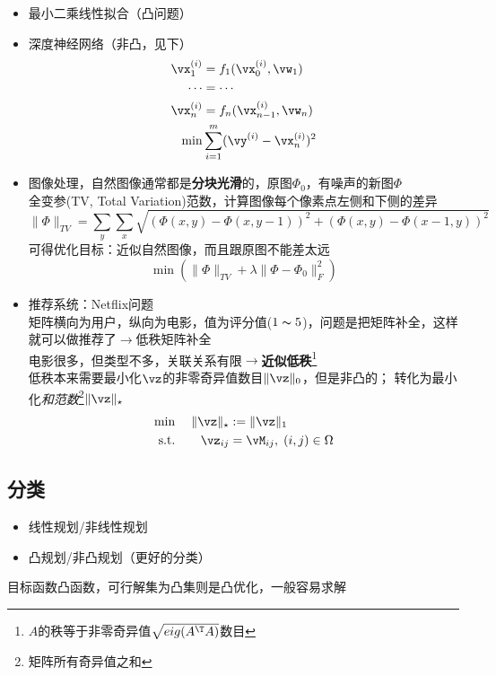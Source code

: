 \documentclass{note}
\begin{document}
\begin{example}
\begin{itemize}
\item 最小二乘线性拟合（凸问题）
\item 深度神经网络（非凸，见下）
\[\begin{aligned}
\vx_1^{(i)}&=f_1(\vx_0^{(i)},\vw_1)\\
\cdots&=\cdots\\
\vx_n^{(i)}&=f_n(\vx_{n-1}^{(i)},\vw_n)\\
\min&\sum_{i=1}^m(\vy^{(i)}-\vx_n^{(i)})^2
\end{aligned}\]
\item 图像处理，自然图像通常都是\textbf{分块光滑}的，原图$\Phi_0$，有噪声的新图$\Phi$\\
全变参(TV, Total Variation)范数，计算图像每个像素点左侧和下侧的差异
\[\|\Phi\|_{TV}=\sum_y\sum_x\sqrt{(\Phi(x,y)-\Phi(x,y-1))^2+(\Phi(x,y)-\Phi(x-1,y))^2}\]
可得优化目标：近似自然图像，而且跟原图不能差太远
\[\min(\|\Phi\|_{TV}+\lambda\|\Phi-\Phi_0\|_F^2)\]
\item 推荐系统：Netflix问题\\
矩阵横向为用户，纵向为电影，值为评分值($1\thicksim 5$)，问题是把矩阵补全，这样就可以做推荐了$\to$低秩矩阵补全\\
电影很多，但类型不多，关联关系有限$\to$\textbf{近似低秩}\footnote{$A$的秩等于非零奇异值$\sqrt{\mathop{eig}(A^\T A)}$数目}\\
低秩本来需要最小化$\vz$的非零奇异值数目$\|\vz\|_0$，但是非凸的；
转化为最小化\emph{和范数}\footnote{矩阵所有奇异值之和}$\|\vz\|_\star$
\[\begin{aligned}
\min& \;&\|\vz\|_\star&:=\|\vz\|_1\\
\text{s.t.}& \;&\vz_{ij}&=\vM_{ij},\;(i,j)\in\Omega
\end{aligned}\]
\end{itemize}
\end{example}

\subsection{分类}
\begin{itemize}
	\item 线性规划/非线性规划
	\item 凸规划/非凸规划（更好的分类）
\end{itemize}
目标函数凸函数，可行解集为凸集则是凸优化，一般容易求解
\end{document}
